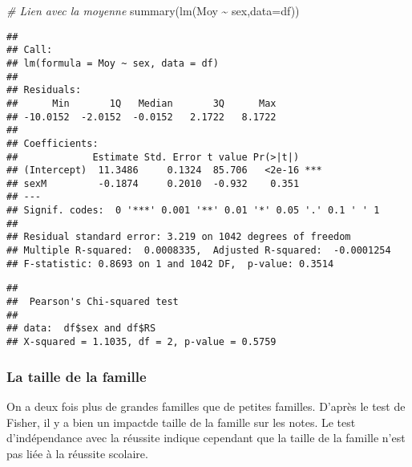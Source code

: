 \documentclass[
]{article}
\newenvironment{Shaded}{\begin{snugshade}}{\end{snugshade}}
\newcommand{\AttributeTok}[1]{\textcolor[rgb]{0.77,0.63,0.00}{#1}}
\newcommand{\CommentTok}[1]{\textcolor[rgb]{0.56,0.35,0.01}{\textit{#1}}}
\newcommand{\FunctionTok}[1]{\textcolor[rgb]{0.00,0.00,0.00}{#1}}
\newcommand{\NormalTok}[1]{#1}
\newcommand{\SpecialCharTok}[1]{\textcolor[rgb]{0.00,0.00,0.00}{#1}}
\begin{document}
\begin{Shaded}
\begin{Highlighting}[]
\CommentTok{\# Lien avec la moyenne}
\FunctionTok{summary}\NormalTok{(}\FunctionTok{lm}\NormalTok{(Moy }\SpecialCharTok{\textasciitilde{}}\NormalTok{ sex,}\AttributeTok{data=}\NormalTok{df))}
\end{Highlighting}
\end{Shaded}

\begin{verbatim}
## 
## Call:
## lm(formula = Moy ~ sex, data = df)
## 
## Residuals:
##      Min       1Q   Median       3Q      Max 
## -10.0152  -2.0152  -0.0152   2.1722   8.1722 
## 
## Coefficients:
##             Estimate Std. Error t value Pr(>|t|)    
## (Intercept)  11.3486     0.1324  85.706   <2e-16 ***
## sexM         -0.1874     0.2010  -0.932    0.351    
## ---
## Signif. codes:  0 '***' 0.001 '**' 0.01 '*' 0.05 '.' 0.1 ' ' 1
## 
## Residual standard error: 3.219 on 1042 degrees of freedom
## Multiple R-squared:  0.0008335,  Adjusted R-squared:  -0.0001254 
## F-statistic: 0.8693 on 1 and 1042 DF,  p-value: 0.3514
\end{verbatim}

\begin{Shaded}
\end{Shaded}

\begin{verbatim}
## 
##  Pearson's Chi-squared test
## 
## data:  df$sex and df$RS
## X-squared = 1.1035, df = 2, p-value = 0.5759
\end{verbatim}

\hypertarget{la-taille-de-la-famille}{%
\subsubsection{La taille de la famille}\label{la-taille-de-la-famille}}

On a deux fois plus de grandes familles que de petites familles. D'après
le test de Fisher, il y a bien un impactde taille de la famille sur les
notes. Le test d'indépendance avec la réussite indique cependant que la
taille de la famille n'est pas liée à la réussite scolaire.
\end{document}
